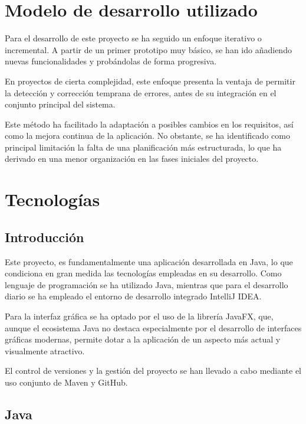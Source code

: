 \documentclass[../../main.tex]{subfiles}
\begin{document}
\section{Modelo de desarrollo utilizado}

Para el desarrollo de este proyecto se ha seguido un enfoque iterativo o incremental. A partir de un primer prototipo muy básico, se han ido añadiendo nuevas funcionalidades y probándolas de forma progresiva.

En proyectos de cierta complejidad, este enfoque presenta la ventaja de permitir la detección y corrección temprana de errores, antes de su integración en el conjunto principal del sistema.

Este método ha facilitado la adaptación a posibles cambios en los requisitos, así como la mejora continua de la aplicación. No obstante, se ha identificado como principal limitación la falta de una planificación más estructurada, lo que ha derivado en una menor organización en las fases iniciales del proyecto.

\clearpage

\section{Tecnologías}


\subsection{Introducción}

Este proyecto, es fundamentalmente una aplicación desarrollada en Java, lo que condiciona en gran medida las tecnologías empleadas en su desarrollo. Como lenguaje de programación se ha utilizado Java, mientras que para el desarrollo diario se ha empleado el entorno de desarrollo integrado IntelliJ IDEA.

Para la interfaz gráfica se ha optado por el uso de la librería JavaFX, que, aunque el ecosistema Java no destaca especialmente por el desarrollo de interfaces gráficas modernas, permite dotar a la aplicación de un aspecto más actual y visualmente atractivo.

El control de versiones y la gestión del proyecto se han llevado a cabo mediante el uso conjunto de Maven y GitHub.


\subsection{Java}
\end{document}
